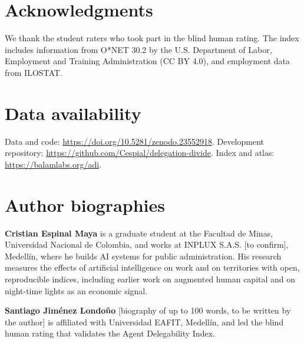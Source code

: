 \documentclass[12pt]{article}
\begin{document}
\section*{Acknowledgments}
We thank the student raters who took part in the blind human rating. The index includes information from O*NET 30.2 by the U.S. Department of Labor, Employment and Training Administration (CC BY 4.0), and employment data from ILOSTAT.

\section*{Data availability}
Data and code: \url{https://doi.org/10.5281/zenodo.23552918}. Development repository: \url{https://github.com/Cespial/delegation-divide}. Index and atlas: \url{https://balamlabs.org/adi}.

\section*{Author biographies}
\textbf{Cristian Espinal Maya} is a graduate student at the Facultad de Minas, Universidad Nacional de Colombia, and works at INPLUX S.A.S. [to confirm], Medell\'in, where he builds AI systems for public administration. His research measures the effects of artificial intelligence on work and on territories with open, reproducible indices, including earlier work on augmented human capital and on night-time lights as an economic signal.

\textbf{Santiago Jim\'enez Londo\~no} [biography of up to 100 words, to be written by the author] is affiliated with Universidad EAFIT, Medell\'in, and led the blind human rating that validates the Agent Delegability Index.
\end{document}
